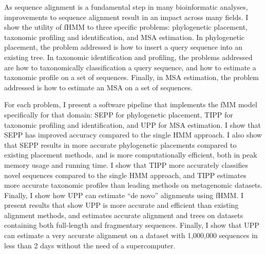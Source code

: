 \documentclass[12pt]{report}	%
\theoremstyle{definition}
\theoremstyle{remark}
\begin{document}
As sequence alignment is a fundamental step in many bioinformatic analyses, improvements to sequence alignment result in an impact across many fields.  I show the utility of fHMM to three specific problems: phylogenetic placement, taxonomic profiling and identification, and MSA estimation.  In phylogenetic placement, the problem addressed is how to insert a query sequence into an existing tree.  In taxonomic identification and profiling, the problems addressed are how to taxonomically classification a query sequence, and how to estimate a taxonomic profile on a set of sequences.  Finally, in MSA estimation, the problem addressed is how to estimate an MSA on a set of sequences.  

For each problem, I present a software pipeline that implements the fMM model specifically for that domain: SEPP for phylogenetic placement, TIPP for taxonomic profiling and identification, and UPP for MSA estimation.  I show that SEPP has improved accuracy compared to the single HMM approach.  I also show that SEPP results in more accurate phylogenetic placements compared to existing placement methods, and is more computationally efficient, both in peak memory usage and running time.  I show that TIPP more accurately classifies novel sequences compared to the single HMM approach, and TIPP estimates more accurate taxonomic profiles than leading methods on metagenomic datasets.  Finally, I show how UPP can estimate ``de novo'' alignments using fHMM.  I present results that show UPP is more accurate and efficient than existing alignment methods, and estimates accurate alignment and trees on datasets containing both full-length and fragmentary sequences.  Finally, I show that UPP can estimate a very accurate alignment on a dataset with 1,000,000 sequences in less than 2 days without the need of a supercomputer.



\tableofcontents   %

\listoftables      %
\listoffigures     %



%
%
% 
% 
% 
% 
% 
% 







\end{document}
